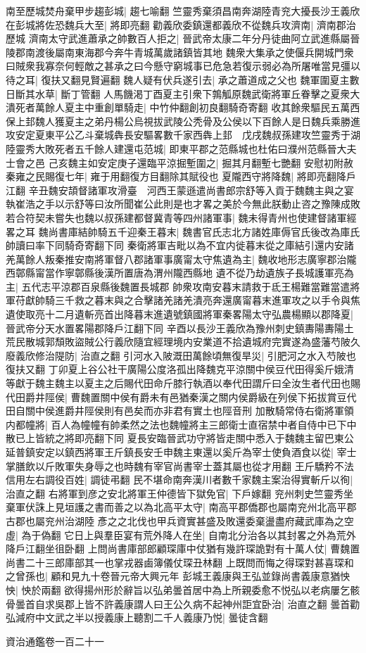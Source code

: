 南至歷城焚舟棄甲步趨彭城|{
	趨七喻翻}
竺靈秀棄須昌南奔湖陸青兖大擾長沙王義欣在彭城將佐恐魏兵大至|{
	將即亮翻}
勸義欣委鎮還都義欣不從魏兵攻濟南|{
	濟南郡治歷城}
濟南太守武進蕭承之帥數百人拒之|{
	晉武帝太康二年分丹徒曲阿立武進縣屬晉陵郡南渡後屬南東海郡今奔牛青城萬歲諸鎮皆其地}
魏衆大集承之使偃兵開城門衆曰賊衆我寡奈何輕敵之甚承之曰今懸守窮城事已危急若復示弱必為所屠唯當見彊以待之耳|{
	復扶又翻見賢遍翻}
魏人疑有伏兵遂引去|{
	承之蕭道成之父也}
魏軍圍夏主數日斷其水草|{
	斷丁管翻}
人馬饑渇丁酉夏主引衆下鶉觚原魏武衛將軍丘眷擊之夏衆大潰死者萬餘人夏主中重創單騎走|{
	中竹仲翻創初良翻騎奇寄翻}
收其餘衆驅民五萬西保上邽魏人獲夏主之弟丹楊公烏視拔武陵公秃骨及公侯以下百餘人是日魏兵乘勝進攻安定夏東平公乙斗棄城犇長安驅畧數千家西犇上邽　戊戌魏叔孫建攻竺靈秀于湖陸靈秀大敗死者五千餘人建還屯范城|{
	即東平郡之范縣城也杜佑曰濮州范縣晉大夫士會之邑}
己亥魏主如安定庚子還臨平涼掘塹圍之|{
	掘其月翻塹七艷翻}
安慰初附赦秦雍之民賜復七年|{
	雍于用翻復方目翻除其賦役也}
夏隴西守將降魏|{
	將即亮翻降戶江翻}
辛丑魏安頡督諸軍攻滑臺　河西王蒙遜遣尚書郎宗舒等入貢于魏魏主與之宴執崔浩之手以示舒等曰汝所聞崔公此則是也才畧之美於今無此朕動止咨之豫陳成敗若合符契未嘗失也魏以叔孫建都督冀青等四州諸軍事|{
	魏未得青州也使建督諸軍經畧之耳}
魏尚書庫結帥騎五千迎秦王暮末|{
	魏書官氏志北方諸姓庫傉官氏後改為庫氏帥讀曰率下同騎奇寄翻下同}
秦衛將軍吉毗以為不宜内徙暮末從之庫結引還内安諸羌萬餘人叛秦推安南將軍督八郡諸軍事廣甯太守焦遺為主|{
	魏收地形志廣寧郡治隴西鄣縣甯當作寧鄣縣後漢所置唐為渭州隴西縣地}
遺不從乃劫遺族子長城護軍亮為主|{
	五代志平涼郡百泉縣後魏置長城郡}
帥衆攻南安暮末請救于氐王楊難當難當遣將軍苻獻帥騎三千救之暮末與之合擊諸羌諸羌潰亮奔還廣甯暮末進軍攻之以手令與焦遺使取亮十二月遺斬亮首出降暮末進遺號鎮國將軍秦畧陽太守弘農楊顯以郡降夏|{
	晉武帝分天水置畧陽郡降戶江翻下同}
辛酉以長沙王義欣為豫州刺史鎮夀陽夀陽土荒民散城郭頹敗盜賊公行義欣隨宜經理境内安業道不拾遺城府完實遂為盛藩芍陂久廢義欣修治隄防|{
	治直之翻}
引河水入陂溉田萬餘頃無復旱災|{
	引肥河之水入芍陂也復扶又翻}
丁卯夏上谷公社干廣陽公度洛孤出降魏克平涼關中侯豆代田得奚斤娥清等獻于魏主魏主以夏主之后賜代田命斤膝行執酒以奉代田謂斤曰全汝生者代田也賜代田爵井陘侯|{
	曹魏置關中侯有爵未有邑猶秦漢之關内侯爵級在列侯下拓拔賞豆代田自關中侯進爵井陘侯則有邑矣而亦非君有實土也陘音刑}
加散騎常侍右衛將軍領内都幢將|{
	百人為幢幢有帥柔然之法也魏幢將主三郎衛士直宿禁中者自侍中已下中散已上皆統之將即亮翻下同}
夏長安臨晉武功守將皆走關中悉入于魏魏主留巴東公延普鎮安定以鎮西將軍王斤鎮長安壬申魏主東還以奚斤為宰士使負酒食以從|{
	宰士掌膳飲以斤敗軍失身辱之也時魏有宰官尚書宰士蓋其屬也從才用翻}
王斤驕矜不法信用左右調役百姓|{
	調徒弔翻}
民不堪命南奔漢川者數千家魏主案治得實斬斤以徇|{
	治直之翻}
右將軍到彦之安北將軍王仲德皆下獄免官|{
	下戶嫁翻}
兖州刺史竺靈秀坐棄軍伏誅上見垣護之書而善之以為北高平太守|{
	南高平郡僑郡也屬南兖州北高平郡古郡也屬兖州治湖陸}
彥之之北伐也甲兵資實甚盛及敗還委棄盪盡府藏武庫為之空虛|{
	為于偽翻}
它日上與羣臣宴有荒外降人在坐|{
	自南北分治各以其封畧之外為荒外降戶江翻坐徂卧翻}
上問尚書庫部郎顧琛庫中仗猶有幾許琛詭對有十萬人仗|{
	曹魏置尚書二十三郎庫部其一也掌戎器鹵簿儀仗琛丑林翻}
上既問而悔之得琛對甚喜琛和之曾孫也|{
	顧和見九十卷晉元帝大興元年}
彭城王義康與王弘並錄尚書義康意猶怏怏|{
	怏於兩翻}
欲得揚州形於辭旨以弘弟曇首居中為上所親委愈不悦弘以老病屢乞骸骨曇首自求吳郡上皆不許義康謂人曰王公久病不起神州詎宜卧治|{
	治直之翻}
曇首勸弘減府中文武之半以授義康上聽割二千人義康乃悦|{
	曇徒含翻}


資治通鑑卷一百二十一
